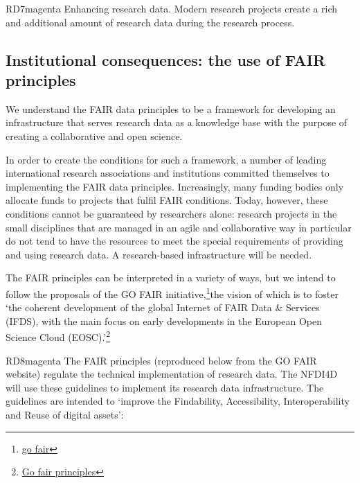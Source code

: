 \documentclass[
  english,
  paper=a4,
  oneside,captions=tableheading
]{scrbook}
\begin{document}
\begin{awesomeblock}[magenta]{1pt}{RD7}{magenta} Enhancing research data. Modern research projects create a rich and additional amount of research data during the research process.\end{awesomeblock}

\hypertarget{institutional-consequences-the-use-of-fair-principles}{%
\subsection{Institutional consequences: the use of FAIR
principles}\label{institutional-consequences-the-use-of-fair-principles}}

We understand the FAIR data principles to be a framework for developing
an infrastructure that serves research data as a knowledge base with the
purpose of creating a collaborative and open science.

In order to create the conditions for such a framework, a number of
leading international research associations and institutions committed
themselves to implementing the FAIR data principles. Increasingly, many
funding bodies only allocate funds to projects that fulfil FAIR
conditions. Today, however, these conditions cannot be guaranteed by
researchers alone: research projects in the small disciplines that are
managed in an agile and collaborative way in particular do not tend to
have the resources to meet the special requirements of providing and
using research data. A research-based infrastructure will be needed.

The FAIR principles can be interpreted in a variety of ways, but we
intend to follow the proposals of the GO FAIR initiative,\footnote{\href{https://www.go-fair.org/go-fair-initiative/}{go
  fair}}the vision of which is to foster `the coherent development of
the global Internet of FAIR Data \& Services (IFDS), with the main focus
on early developments in the European Open Science Cloud
(EOSC).'\footnote{\href{https://www.go-fair.org/fair-principles/}{Go
  fair principles}}

\begin{awesomeblock}[magenta]{1pt}{RD8}{magenta} The FAIR principles (reproduced below from the GO FAIR website) regulate the technical implementation of research data. The NFDI4D will use these guidelines to implement its research data infrastructure. The guidelines are intended to ‘improve the Findability, Accessibility, Interoperability and Reuse of digital assets’:\end{awesomeblock}
\end{document}
